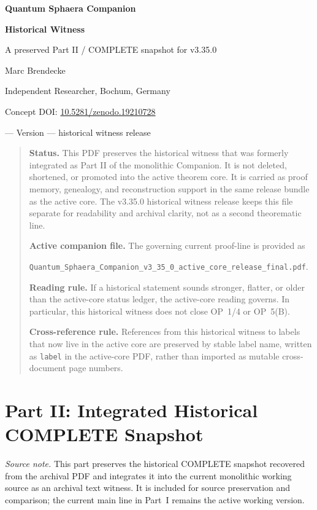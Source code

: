 
\begin{center}
{\LARGE\bfseries Quantum Sphaera Companion}\par\vspace{0.4em}
{\Large\bfseries Historical Witness}\par\vspace{0.8em}
{\large A preserved Part II / COMPLETE snapshot for v3.35.0}\par\vspace{0.8em}
Marc Brendecke\par
Independent Researcher, Bochum, Germany\par
Concept DOI: \href{https://doi.org/10.5281/zenodo.19210728}{10.5281/zenodo.19210728}\par
\docdate{} --- Version \docversion{} --- historical witness release
\end{center}
\thispagestyle{fancy}

\begin{quote}\small
\noindent\textbf{Status.} This PDF preserves the historical witness that was formerly integrated as Part II of the monolithic Companion. It is not deleted, shortened, or promoted into the active theorem core. It is carried as proof memory, genealogy, and reconstruction support in the same release bundle as the active core. The v3.35.0 historical witness release keeps this file separate for readability and archival clarity, not as a second theorematic line.

\medskip
\noindent\textbf{Active companion file.} The governing current proof-line is provided as\par
\texttt{Quantum\_Sphaera\_Companion\_v3\_35\_0\_active\_core\_release\_final.pdf}.

\medskip
\noindent\textbf{Reading rule.} If a historical statement sounds stronger, flatter, or older than the active-core status ledger, the active-core reading governs. In particular, this historical witness does not close OP~1/4 or OP~5(B).

\medskip
\noindent\textbf{Cross-reference rule.} References from this historical witness to labels that now live in the active core are preserved by stable label name, written as \texttt{label} in the active-core PDF, rather than imported as mutable cross-document page numbers.
\end{quote}

\clearpage
\tableofcontents
\clearpage
\part*{Part II: Integrated Historical COMPLETE Snapshot}

\begin{center}
\textit{Source note.} This part preserves the historical COMPLETE snapshot recovered from the archival PDF and integrates it into the current monolithic working source as an archival text witness. It is included for source preservation and comparison; the current main line in Part~I remains the active working version.
\end{center}

